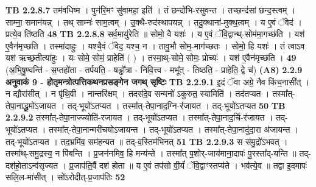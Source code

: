\documentclass[17pt]{extarticle}
\begin{document}
                                \textbf{ TB 2.2.8.7} \newline
                  तम॑वधिष्म । पुन॑रि॒मꣳ सु॑वामहा॒ इति॑ । तं छन्दो॑भि-रसुवन्त । तच्छन्द॑सां छन्द॒स्त्वम् । साम्ना॒ समान॑यन्न् । तथ् साम्नः॑ साम॒त्वम् । उ॒क्थै-रुद॑स्थापयन्न् । तदु॒क्थाना॑-मुक्थ॒त्वम् । य ए॒वं ॅवेद॑ । प्रत्ये॒व ति॑ष्ठति \textbf{ 48} \newline
                  \newline
                                \textbf{ TB 2.2.8.8} \newline
                  सर्व॒मायु॑रेति ॥ सोमो॒ वै यशः॑ । य ए॒वं ॅवि॒द्वान्थ्-सोम॑मा॒गच्छ॑ति । यश॑ ए॒वैन॑मृच्छति । तस्मा॑दाहुः । यश्चै॒वं ॅवेद॒ यश्च॒ न । तावु॒भौ सोम॒-माग॑च्छतः । सोमो॒ हि यशः॑ । तं त्वाऽव यश॑ ऋच्छ॒तीत्या॑हुः । यः सोमे॒ सोमं॒ प्राहेति॑ ( ) । तस्मा॒थ्-सोमे॒ सोमः॒ प्रोच्यः॑ । यश॑ ए॒वैन॑मृच्छति । \textbf{ 49} \newline
                  \newline
                                    (अ॒भि॒षु॒ण्वन्ति॑ - स॒प्तहो॑ता - तर्पयति॒ - षड्ढो᳚त्रा - निवि॒त्त्व - मभू᳚त् - तिष्ठति॒ - प्राहेति॒ द्वे च॑) \textbf{(A8)} \newline \newline
                \textbf{ 2.2.9     अनुवाकं   9 - होतृमन्त्रोत्पत्तिकथनप्रसङ्गेन जगथ् सृष्टिः} \newline
                                \textbf{ TB 2.2.9.1} \newline
                  इ॒दं ॅवा अग्रे॒ नैव किंच॒नासी᳚त् । न द्यौरा॑सीत् । न पृ॑थि॒वी । नान्तरि॑क्षम् । तदस॑दे॒व सन्मनो॑ ऽकुरुत॒ स्यामिति॑ । तद॑तप्यत । तस्मा᳚त्-तेपा॒नाद्धू॒मो॑ऽजायत । तद्-भूयो॑ऽतप्यत । तस्मा᳚त्-तेपा॒नाद॒ग्नि-र॑जायत । तद्-भूयो॑ऽतप्यत \textbf{ 50} \newline
                  \newline
                                \textbf{ TB 2.2.9.2} \newline
                  तस्मा᳚त्-तेपा॒नाज्ज्योति॑-रजायत । तद्-भूयो॑ऽतप्यत । तस्मा᳚त्-तेपा॒नाद॒र्चि-र॑जायत । तद्-भूयो॑ऽतप्यत । तस्मा᳚त्-तेपा॒नान्मरी॑चयोऽजायन्त । तद्-भूयो॑ऽतप्यत । तस्मा᳚त्-तेपा॒नादु॑दा॒रा अ॑जायन्त । तद्-भूयो॑ऽतप्यत । तद॒भ्रमि॑व॒ सम॑हन्यत ॥ तद्-व॒स्तिम॑भिनत् \textbf{ 51} \newline
                  \newline
                                \textbf{ TB 2.2.9.3} \newline
                  स स॑मु॒द्रो॑ऽभवत् । तस्मा᳚थ्-समु॒द्रस्य॒ न पि॑बन्ति । प्र॒जन॑नमिव॒ हि मन्य॑न्ते । तस्मा᳚त् प॒शोर्-जाय॑माना॒दापः॑ पु॒रस्ता᳚द्-यन्ति ॥ तद्-दश॑हो॒ताऽन्व॑सृज्यत । प्र॒जाप॑ति॒र्वै दश॑ होता ॥ य ए॒वं तप॑सो वी॒र्यं॑ ॅवि॒द्वाꣳस्तप्य॑ते । भव॑त्ये॒व ॥ तद्वा इ॒दमापः॑ सलि॒ल-मा॑सीत् । सो॑ऽरोदीत्-प्र॒जाप॑तिः \textbf{ 52} \newline
\end{document}
